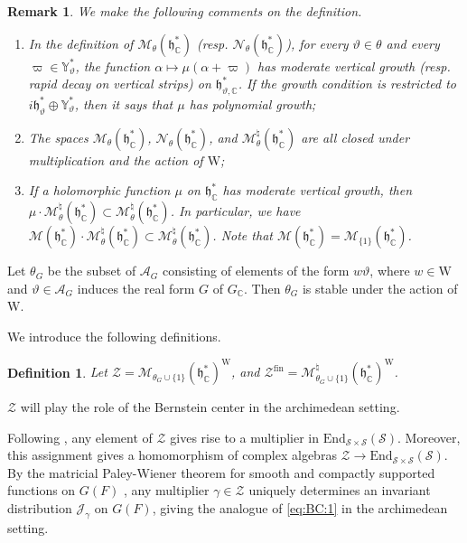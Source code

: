 \documentclass[iccmp]{ipbook}
\newcommand{\BC}{{\mathbb {C}}}
\newcommand{\BY}{{\mathbb {Y}}}
\newcommand{\CJ}{{\mathcal {J}}}
\newcommand{\CM}{{\mathcal {M}}}
\newcommand{\CN}{{\mathcal {N}}}
\newcommand{\CS}{{\mathcal {S}}}
\newcommand{\CZ}{{\mathcal {Z}}}
\newcommand{\Fh}{{\mathfrak {h}}}
\newcommand{\RW}{{\mathrm {W}}}
\newcommand{\End}{{\mathrm{End}}}
\def\alp{{\alpha}}
\def\gam{{\gamma}}
\def\vpi{\varpi}
\newcommand{\fin}{\mathrm{fin}}
\newtheorem{defin}[thm]{Definition}
\newtheorem{rmk}[thm]{Remark}
\begin{document}
\begin{rmk}
We make the following comments on the definition.

\begin{enumerate}
\item In the definition of $\CM_\theta(\Fh^*_\BC)$ (resp. $\CN_\theta(\Fh^*_\BC)$), for every $\vartheta\in \theta$ and every $\vpi\in \BY^*_\vartheta$, the function $\alp\mapsto \mu(\alp+\vpi)$ has moderate vertical growth (resp. rapid decay on vertical strips) on $\Fh^*_{\vartheta,\BC}$. If the growth condition is restricted to $i\Fh^*_\vartheta\oplus \BY^*_\vartheta$, then it says that $\mu$ has polynomial growth;

\item The spaces $\CM_\theta(\Fh^*_\BC)$, $\CN_\theta(\Fh^*_\BC)$, and $\CM^\natural_\theta(\Fh^*_\BC)$ are all closed under multiplication and the action of $\RW$;

\item If a holomorphic function $\mu$ on $\Fh^*_\BC$ has moderate vertical growth, then $\mu\cdot \CM^\natural_\theta(\Fh^*_\BC)\subset \CM^\natural_\theta(\Fh^*_\BC)$. In particular, we have $\CM(\Fh^*_\BC)\cdot \CM^\natural_\theta(\Fh^*_\BC)\subset \CM^\natural_\theta(\Fh^*_\BC)$. Note that $\CM(\Fh^*_\BC) = \CM_{\{1\}}(\Fh^*_\BC)$.
\end{enumerate}
\end{rmk}

Let $\theta_G$ be the subset of $\mathscr A_G$ consisting of elements of the form $w\vartheta$, where $w\in \RW$ and $\vartheta\in \mathscr A_G$ induces the real form $G$ of $G_\BC$. Then $\theta_G$ is stable under the action of $\RW$.

We introduce the following definitions.

\begin{defin}\label{defin:archimedean-Bernstein-center}
Let $\CZ = \CM_{\theta_G\cup\{1\}}(\Fh^*_\BC)^\RW$, and $\CZ^\fin = \CM^\natural_{\theta_G\cup\{1\}}(\Fh^*_\BC)^\RW$.
\end{defin}
$\CZ$ will play the role of the Bernstein center in the archimedean setting.

Following \cite[Thm.~2.13]{MR4298750}, any element of $\CZ$ gives rise to a multiplier in $\End_{\CS\times \CS}(\CS)$. Moreover, this assignment gives a homomorphism of complex algebras $\CZ\to \End_{\CS\times \CS}(\CS)$. By the matricial Paley-Wiener theorem for smooth and compactly supported functions on $G(F)$ \cite{MR2183287}, any multiplier $\gam\in \CZ$ uniquely determines an invariant distribution $\CJ_\gam$ on $G(F)$, giving the analogue of \eqref{eq:BC:1} in the archimedean setting.
\end{document}
